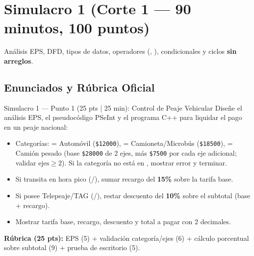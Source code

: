 \documentclass[11pt,letterpaper]{article}
\begin{document}

\clearpage
\section{Simulacro 1 (Corte 1 — 90 minutos, 100 puntos)}

 Análisis EPS, DFD, tipos de datos, operadores (\codigo{/}, \codigo{\%}), condicionales y ciclos \textbf{sin arreglos}.

\subsection{Enunciados y Rúbrica Oficial}

\begin{ejercicio}{Simulacro 1 — Punto 1 (25 pts | 25 min): Control de Peaje Vehicular}
Diseñe el análisis EPS, el pseudocódigo PSeInt y el programa C++ para liquidar el pago en un peaje nacional:
\begin{itemize}
  \item Categorías:  = Automóvil (\texttt{\$12000}),  = Camioneta/Microbús (\texttt{\$18500}),  = Camión pesado (base \texttt{\$28000} de 2 ejes, más \texttt{\$7500} por cada eje adicional; validar $\text{ejes} \ge 2$). Si la categoría no está en , mostrar error y terminar.
  \item Si transita en hora pico (/), sumar recargo del \textbf{15\%} sobre la tarifa base.
  \item Si posee Telepeaje/TAG (/), restar descuento del \textbf{10\%} sobre el subtotal (base + recargo).
  \item Mostrar tarifa base, recargo, descuento y total a pagar con 2 decimales.
\end{itemize}
\textbf{Rúbrica (25 pts):} EPS (5) + validación categoría/ejes (6) + cálculo porcentual sobre subtotal (9) + prueba de escritorio (5).
\end{ejercicio}
\end{document}
